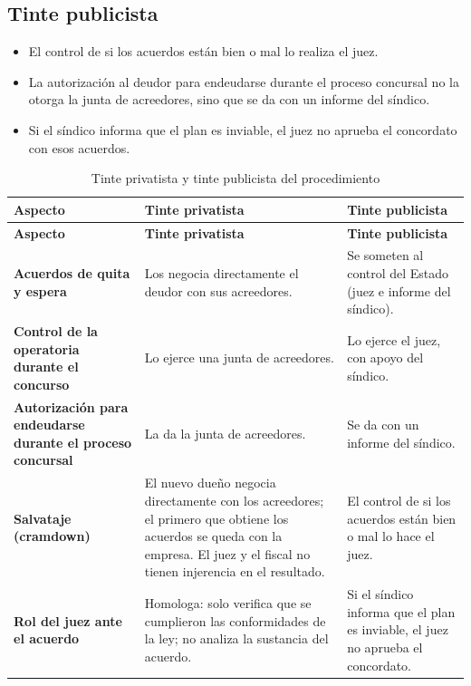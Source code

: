 \documentclass[12pt,oneside]{book}
\begin{document}
\subsection{Tinte publicista}

\begin{itemize}
    \item El control de si los acuerdos están bien o mal lo realiza el juez.
    \item La autorización al deudor para endeudarse durante el proceso concursal no la otorga la junta de acreedores, sino que se da con un informe del síndico.
    \item Si el síndico informa que el plan es inviable, el juez no aprueba el concordato con esos acuerdos.
\end{itemize}

\begin{longtable}{>{\raggedright\arraybackslash}p{} >{\raggedright\arraybackslash}p{} >{\raggedright\arraybackslash}p{}}
\caption{Tinte privatista y tinte publicista del procedimiento}\\
\toprule
\textbf{Aspecto} & \textbf{Tinte privatista} & \textbf{Tinte publicista} \\
\midrule
\endfirsthead
\toprule
\textbf{Aspecto} & \textbf{Tinte privatista} & \textbf{Tinte publicista} \\
\midrule
\endhead
\bottomrule
\endlastfoot
\textbf{Acuerdos de quita y espera} & Los negocia directamente el deudor con sus acreedores. & Se someten al control del Estado (juez e informe del síndico). \\
\textbf{Control de la operatoria durante el concurso} & Lo ejerce una junta de acreedores. & Lo ejerce el juez, con apoyo del síndico. \\
\textbf{Autorización para endeudarse durante el proceso concursal} & La da la junta de acreedores. & Se da con un informe del síndico. \\
\textbf{Salvataje (cramdown)} & El nuevo dueño negocia directamente con los acreedores; el primero que obtiene los acuerdos se queda con la empresa. El juez y el fiscal no tienen injerencia en el resultado. & El control de si los acuerdos están bien o mal lo hace el juez. \\
\textbf{Rol del juez ante el acuerdo} & Homologa: solo verifica que se cumplieron las conformidades de la ley; no analiza la sustancia del acuerdo. & Si el síndico informa que el plan es inviable, el juez no aprueba el concordato. \\
\end{longtable}
\end{document}
